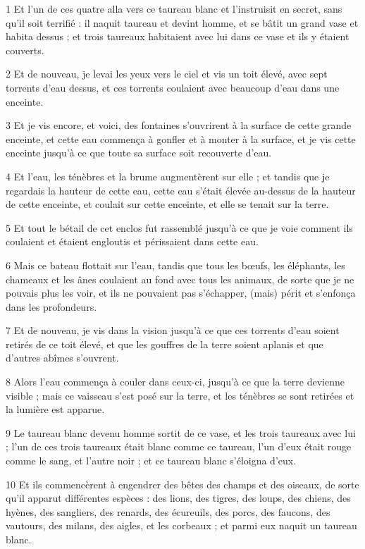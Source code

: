 \par 1 Et l'un de ces quatre alla vers ce taureau blanc et l'instruisit en secret, sans qu'il soit terrifié : il naquit taureau et devint homme, et se bâtit un grand vase et habita dessus ; et trois taureaux habitaient avec lui dans ce vase et ils y étaient couverts.
\par 2 Et de nouveau, je levai les yeux vers le ciel et vis un toit élevé, avec sept torrents d'eau dessus, et ces torrents coulaient avec beaucoup d'eau dans une enceinte.
\par 3 Et je vis encore, et voici, des fontaines s'ouvrirent à la surface de cette grande enceinte, et cette eau commença à gonfler et à monter à la surface, et je vis cette enceinte jusqu'à ce que toute sa surface soit recouverte d'eau.
\par 4 Et l'eau, les ténèbres et la brume augmentèrent sur elle ; et tandis que je regardais la hauteur de cette eau, cette eau s'était élevée au-dessus de la hauteur de cette enceinte, et coulait sur cette enceinte, et elle se tenait sur la terre.
\par 5 Et tout le bétail de cet enclos fut rassemblé jusqu'à ce que je voie comment ils coulaient et étaient engloutis et périssaient dans cette eau.
\par 6 Mais ce bateau flottait sur l'eau, tandis que tous les bœufs, les éléphants, les chameaux et les ânes coulaient au fond avec tous les animaux, de sorte que je ne pouvais plus les voir, et ils ne pouvaient pas s'échapper, (mais) périt et s'enfonça dans les profondeurs.
\par 7 Et de nouveau, je vis dans la vision jusqu'à ce que ces torrents d'eau soient retirés de ce toit élevé, et que les gouffres de la terre soient aplanis et que d'autres abîmes s'ouvrent.
\par 8 Alors l'eau commença à couler dans ceux-ci, jusqu'à ce que la terre devienne visible ; mais ce vaisseau s'est posé sur la terre, et les ténèbres se sont retirées et la lumière est apparue.
\par 9 Le taureau blanc devenu homme sortit de ce vase, et les trois taureaux avec lui ; l'un de ces trois taureaux était blanc comme ce taureau, l'un d'eux était rouge comme le sang, et l'autre noir ; et ce taureau blanc s'éloigna d'eux.
\par 10 Et ils commencèrent à engendrer des bêtes des champs et des oiseaux, de sorte qu'il apparut différentes espèces : des lions, des tigres, des loups, des chiens, des hyènes, des sangliers, des renards, des écureuils, des porcs, des faucons, des vautours, des milans, des aigles, et les corbeaux ; et parmi eux naquit un taureau blanc.
